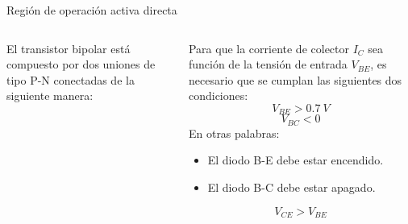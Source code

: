\documentclass[t,aspectratio=169]{beamer}
\begin{document}
\begin{frame}{Región de operación activa directa}
\begin{columns}
\begin{column}{0.5\textwidth}

El transistor bipolar está compuesto por dos uniones de tipo P-N conectadas de la siguiente manera:

\begin{figure}
    \centering
\end{figure}

\end{column}
\begin{column}{0.5\textwidth}

Para que la corriente de colector $I_C$ sea función de la tensión de entrada $V_{BE}$, es necesario que se cumplan las siguientes dos condiciones:
%
\[ V_{BE} > 0.7\ V \]
%
\[ V_{BC} < 0 \]
%
En otras palabras:

\begin{itemize}
    \item El diodo B-E debe estar encendido.
    \item El diodo B-C debe estar apagado.
\end{itemize}
%
\[ \boxed{V_{CE} > V_{BE}} \]

\end{column}
\end{columns}
\end{frame}
\end{document}
